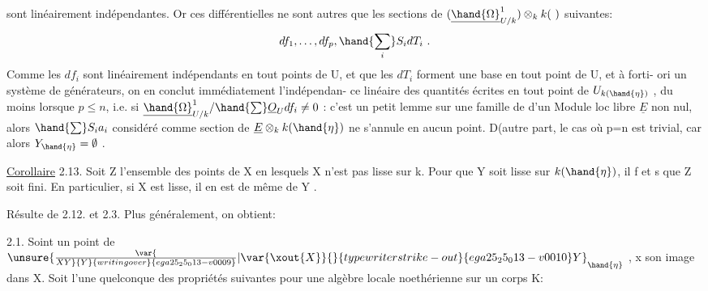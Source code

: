 
sont linéairement indépendantes. Or ces différentielles ne sont autres
que les sections de $(\underline{\hand{\Omega}}^1_{U/k})\otimes_k k(\ )$ suivantes:
\[ df_1, \ldots, df_p , \hand{\sum_i} S_i dT_i \ . \]
Comme les $df_i$ sont linéairement indépendants en tout points de U, et
que les $dT_i$ forment une base  en tout point de U,  et à forti-%
ori un système de générateurs, on en conclut immédiatement l'indépendan-%
ce linéaire des quantités écrites en tout point de $U_{k(\hand{\eta})}$ , du moins
lorsque $p\leq n$, i.e. si  $\underline{\hand{\Omega}}^1_{U/k} / \hand{\sum} \underline{O}_U df_i \neq 0$ : c'est un petit
lemme sur une famille de   d'un Module loc libre $\underline{E}$ non
nul, alors $\hand{\sum} S_i a_i$ considéré comme section de $\underline{E}\otimes_k k(\hand{\eta})$ ne s'annule
en aucun point. D(autre part, le cas où p=n est trivial, car alors
$Y_{\hand{\eta}} = \emptyset$ .

\uline{Corollaire} 2.13. Soit Z l'ensemble des points de X en lesquels X
n'est pas lisse sur k. Pour que Y soit lisse sur $k(\hand{\eta})$, il f et s
que Z soit fini. En particulier, si X est lisse, il en est de même de
Y .

Résulte de 2.12. et 2.3. Plus généralement, on obtient:

\uline{} 2.1. Soint  un point de $\unsure{\var{\over{X}{Y}}{Y}{writing over}{ega25_25_013-v0009}|\var{\xout{X}}{}{typewriter strike-out}{ega25_25_013-v0010}Y}_{\hand{\eta}}$ , x son image dans X. Soit
  l'une quelconque des propriétés suivantes pour une algèbre
locale noethérienne sur un corps K:

